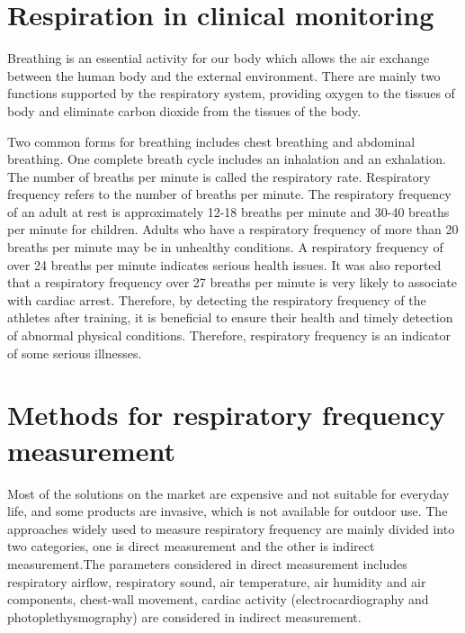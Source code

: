 \section{Respiration in clinical monitoring}

Breathing is an essential activity for our body which allows the air exchange between the human body and the external environment. There are mainly two functions supported by the respiratory system, providing oxygen to the tissues of body and eliminate carbon dioxide from the tissues of the body. 

Two common forms for breathing includes chest breathing and abdominal breathing. One complete breath cycle includes an inhalation and an exhalation. The number of breaths per minute is called the respiratory rate. Respiratory frequency refers to the number of breaths per minute. The respiratory frequency of an adult at rest is approximately 12-18 breaths per minute and 30-40 breaths per minute for children. Adults who have a respiratory frequency of more than 20 breaths per minute may be in unhealthy conditions. A respiratory frequency of over 24 breaths per minute indicates serious health issues. It was also reported that a respiratory frequency over 27 breaths per minute is very likely to associate with cardiac arrest.\cite{Cretikos2008OfMBA} Therefore, by detecting the respiratory frequency of the athletes after training, it is beneficial to ensure their health and timely detection of abnormal physical conditions. Therefore, respiratory frequency is an indicator of some serious illnesses.

\section{Methods for respiratory frequency measurement}
Most of the solutions on the market are expensive and not suitable for everyday life, and some products are invasive, which is not available for outdoor use. The approaches widely used to measure respiratory frequency are mainly divided into two categories, one is direct measurement and the other is indirect measurement.The parameters considered in direct measurement includes respiratory airflow, respiratory sound, air temperature, air humidity and air components, chest-wall movement, cardiac activity (electrocardiography and photoplethysmography) are considered in indirect measurement. 
\cite{Massaroni2019Contact-BasedRate} 

